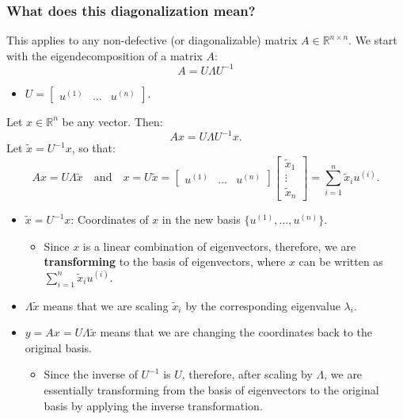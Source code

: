 \subsubsection{What does this diagonalization mean?}
\begin{intuition}
    This applies to any non-defective (or diagonalizable) matrix \( A \in \mathbb{R}^{n \times n} \). We start with the eigendecomposition of a matrix \( A \):
    \[
    A = U \Lambda U^{-1}
    \]
    \begin{itemize}
        \item $U = \begin{bmatrix} u^{(1)} & \dots & u^{(n)} \end{bmatrix}.$
    \end{itemize}
    \vspace{1em}

    Let \( x \in \mathbb{R}^n \) be any vector. Then:
    \[
    A x = U \Lambda U^{-1} x.
    \]
    Let \( \tilde{x} = U^{-1} x \), so that:
    \[
    A x = U \Lambda \tilde{x} \quad \text{and} \quad x = U \tilde{x} = \begin{bmatrix} u^{(1)} & \dots & u^{(n)} \end{bmatrix} \begin{bmatrix} \tilde{x}_1 \\ \vdots \\ \tilde{x}_n \end{bmatrix} = \sum_{i=1}^{n} \tilde{x}_i u^{(i)}.
    \]
    \begin{itemize}
        \item \( \tilde{x} = U^{-1}x\): Coordinates of $x$ in the new basis \( \{u^{(1)}, \dots, u^{(n)}\} \).
        \begin{itemize}
            \item Since $x$ is a linear combination of eigenvectors, therefore, we are \textbf{transforming} to the basis of eigenvectors, where $x$ can be written as $\sum_{i=1}^{n} \tilde{x}_i u^{(i)}$.
        \end{itemize}
        \item \( \Lambda \tilde{x} \) means that we are scaling \( \tilde{x}_i \) by the corresponding eigenvalue \( \lambda_i \).
        \item \(y = Ax = U \Lambda \tilde{x} \) means that we are changing the coordinates back to the original basis.
        \begin{itemize}
            \item Since the inverse of $U^{-1}$ is $U$, therefore, after scaling by $\Lambda$, we are essentially transforming from the basis of eigenvectors to the original basis by applying the inverse transformation. 
        \end{itemize}
    \end{itemize}
\end{intuition}

